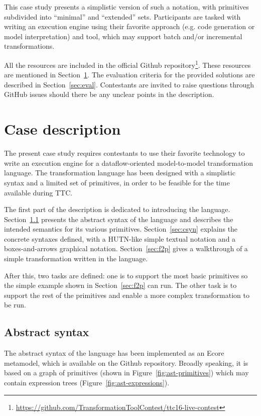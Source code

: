 \documentclass[a4paper]{scrartcl}
\begin{document}
This case study presents a simplistic version of such a notation, with
primitives subdivided into ``minimal'' and ``extended''
sets. Participants are tasked with writing an execution engine using
their favorite approach (e.g. code generation or model interpretation)
and tool, which may support batch and/or incremental transformations.

All the resources are included in the official Github
repository\footnote{\url{https://github.com/TransformationToolContest/ttc16-live-contest}}. These
resources are mentioned in Section~\ref{sec:case}. The evaluation
criteria for the provided solutions are described in
Section~\ref{sec:eval}. Contestants are invited to raise questions
through GitHub issues should there be any unclear points in the
description.

\section{Case description}
\label{sec:case}

The present case study requires contestants to use their favorite
technology to write an execution engine for a dataflow-oriented
model-to-model transformation language. The transformation language
has been designed with a simplistic syntax and a limited set of
primitives, in order to be feasible for the time available during TTC.

The first part of the description is dedicated to introducing the
language. Section~\ref{sec:asyn} presents the abstract syntax of the
language and describes the intended semantics for its various
primitives. Section~\ref{sec:csyn} explains the concrete syntaxes
defined, with a HUTN-like simple textual notation and a
boxes-and-arrows graphical notation. Section~\ref{sec:f2p} gives a
walkthrough of a simple transformation written in the language.

After this, two tasks are defined: one is to support the most basic
primitives so the simple example shown in Section~\ref{sec:f2p} can
run. The other task is to support the rest of the primitives and
enable a more complex transformation to be run.

\subsection{Abstract syntax}
\label{sec:asyn}

The abstract syntax of the language has been implemented as an Ecore
metamodel, which is available on the Github repository. Broadly
speaking, it is based on a graph of primitives (shown in
Figure~\ref{fig:ast-primitives}) which may contain expression trees
(Figure~\ref{fig:ast-expressions}).
\end{document}

